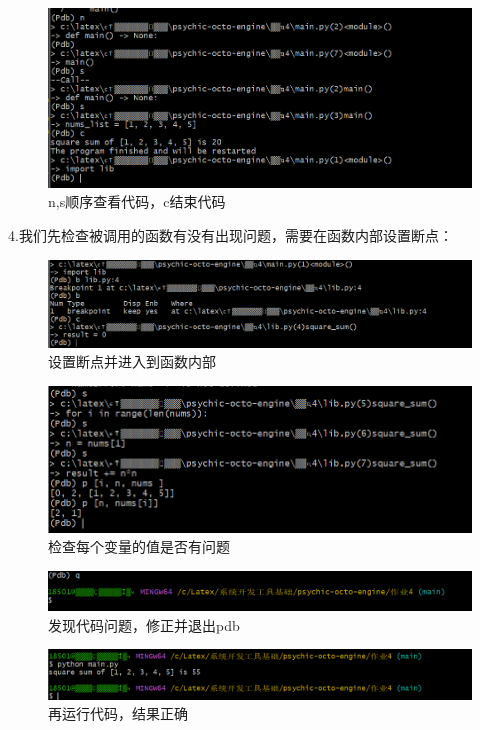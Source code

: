 \documentclass{ctexart}
\begin{document}
\begin{enumerate}
        \begin{figure}[H]
            \centering
            \includegraphics[width=14cm]{3063da819b46b90890b2c0e1296a91f2.png}
            \caption{n,s顺序查看代码，c结束代码}
            \label{fig:10}
            \end{figure}   
    4.我们先检查被调用的函数有没有出现问题，需要在函数内部设置断点：
    \begin{figure}[H]
        \centering
        \includegraphics[width=14cm]{a3a391f7ff6e2a6b11844a5dfa5f5fdc.png}
        \caption{设置断点并进入到函数内部}
        \label{fig:11}
        \end{figure}   
    \begin{figure}[H]
        \centering
        \includegraphics[width=14cm]{3ad352e05f8af1634160224f0329fad2.png}
        \caption{检查每个变量的值是否有问题}
        \label{fig:12}
        \end{figure}   
\begin{figure}[H]
        \centering
        \includegraphics[width=14cm]{d96ee8d517b7678b97d1c7a750aaeaba.png}
        \caption{发现代码问题，修正并退出pdb}
        \label{fig:13}
        \end{figure}   
        \begin{figure}[H]
        \centering
        \includegraphics[width=14cm]{2a2e892688262f70ab14db9d9f4bac74.png}
        \caption{再运行代码，结果正确}
        \label{fig:14}
        \end{figure}   
\end{enumerate}
\end{document}
